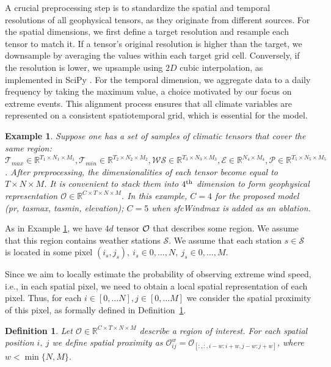 \documentclass{article}
\newtheorem{example}{Example}
\newtheorem{definition}{Definition}[section]
\begin{document}
A crucial preprocessing step is to standardize the spatial and temporal resolutions of all geophysical tensors, as they originate from different sources. 
For the spatial dimensions, we first define a target resolution and resample each tensor to match it. If a tensor's original resolution is higher than the target, we downsample by averaging the values within each target grid cell. Conversely, if the resolution is lower, we upsample using $2D$ cubic interpolation, as implemented in SciPy \cite{2020SciPy-NMeth}. 
For the temporal dimension, we aggregate data to a daily frequency by taking the maximum value, a choice motivated by our focus on extreme events. This alignment process ensures that all climate variables are represented on a consistent spatiotemporal grid, which is essential for the model.

\begin{example}
\label{example:O}
Suppose one has a set of samples of climatic tensors that cover the same region: $\mathcal{T}_{max} \in \mathbb{R}^{T_1 \times N_1\times M_1}, \mathcal{T}_{min} \in \mathbb{R}^{T_2\times N_2\times M_2}, \mathcal{WS} \in \mathbb{R}^{T_3\times N_3\times M_3}, \mathcal{E} \in \mathbb{R}^{N_4\times M_4}, \mathcal{P} \in \mathbb{R}^{T_5\times N_5\times M_5}$. After preprocessing, the dimensionalities of each tensor become equal to $T \times N \times M$.
It is convenient to stack them into $4^{\textup{th}}$ dimension to form geophysical representation  $\mathcal{O} \in \mathbb{R}^{C \times T \times N \times M}$. In this example, $C = 4$ for the proposed model (pr, tasmax, tasmin, elevation); $C = 5$ when sfcWindmax is added as an ablation.
\end{example}

As in Example \ref{example:O}, we have $4d$ tensor $\cal{O}$ that describes some region. We assume that this region contains weather stations $\mathcal{S}$. We assume that each station $s \in \mathcal{S}$ is located in some pixel $(i_s, j_s), ~ i_s \in {0, \dots, N}, ~ j_s \in {0, \dots, M}$. 

Since we aim to locally estimate the probability of observing extreme wind speed, i.e., in each spatial pixel, we need to obtain a local spatial representation of each pixel. Thus, for each $i \in [0, \dots N], j \in [0, \dots M]$ we consider the spatial proximity of this pixel, as formally defined in Definition~\ref{def:spatial_vicinity}.

\begin{definition}
\label{def:spatial_vicinity}
Let $\mathcal{O} \in \mathbb{R}^{C \times T \times N \times M}$ describe a region of interest. For each spatial position $i,\ j$ we define spatial proximity as $\mathcal{O}^w_{ij} = \mathcal{O}_{[:, :, i - w : i + w, j - w:j + w]}$, where $w < \min \{N, M\}$. 
\end{definition}
\end{document}
